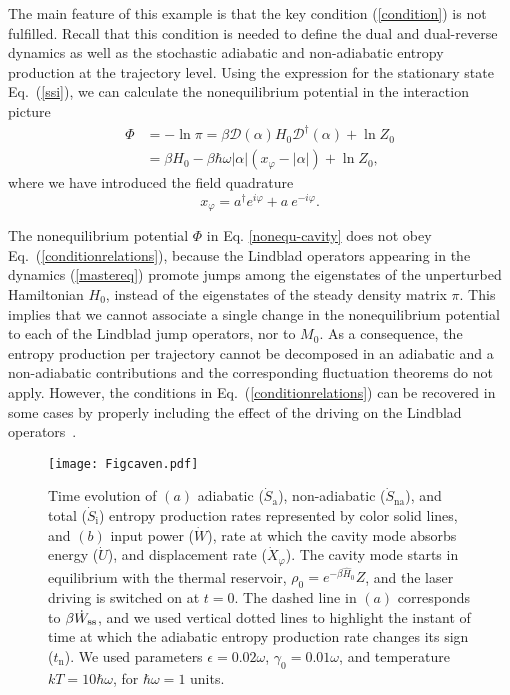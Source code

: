 \documentclass[aps,prx,twocolumn,showpacs,floatfix,superscriptaddress,graphics,longbibliography]{revtex4-1}
\newcommand{\HAT}{}
\begin{document}
The main feature of this example is that the key condition (\ref{condition}) is not fulfilled. Recall that this condition is needed to define the dual and dual-reverse dynamics as well as the stochastic adiabatic and non-adiabatic entropy production at the trajectory level. Using the expression for the stationary state  Eq.~(\ref{ssi}), we can calculate the nonequilibrium potential in the interaction picture
\begin{align} \label{nonequ-cavity}
\HAT{\Phi} &= -\ln\pi= \beta \mathcal{D}(\alpha) H_0 \mathcal{D}^\dagger(\alpha) + \ln Z_0  \nonumber \\ 
&=  \beta H_0 - \beta \hbar \omega |\alpha|( x_{\varphi}-|\alpha|)  + \ln Z_0,
\end{align}
where we have introduced 
the field quadrature 
\begin{equation}
 x_{\varphi}  =  a^\dagger e^{i \varphi} +  a^{~}e^{-i \varphi}.
 \end{equation}


The nonequilibrium potential $\Phi$ in Eq. \eqref{nonequ-cavity} does not obey Eq.~(\ref{conditionrelations}), because the Lindblad operators appearing in the dynamics (\ref{mastereq}) promote jumps among the  eigenstates of the unperturbed Hamiltonian $H_0$, instead of the eigenstates of the steady density matrix $\pi$. This implies that we cannot associate a single change in the nonequilibrium potential to each of the Lindblad jump operators, 
nor to $M_0$. As a consequence, the entropy production per trajectory  cannot be decomposed in an adiabatic and  a non-adiabatic contributions and the corresponding fluctuation theorems do not apply. 
However, the conditions in Eq.~(\ref{conditionrelations}) can be recovered in some cases by properly including the effect of the driving on the Lindblad operators~\cite{JordanPRA}.


\begin{figure*}[t]
\begin{center}
\texttt{[image: Figcaven.pdf]}
\caption{Time evolution of $(a)$ adiabatic ($\dot{S}_{\mathrm a}$), non-adiabatic ($\dot{S}_{\mathrm{na}}$), and total ($\dot{S}_{\mathrm i}$) entropy production rates represented by 
color solid lines, and $(b)$ input power ($\dot{W}$), rate at which the cavity mode absorbs energy ($\dot{U}$), and displacement rate ($\dot{X}_{\varphi}$). The cavity mode starts in 
equilibrium with the thermal reservoir, $\rho_{0}= e^{- \beta \hat{H}_0}{Z}$, and the laser driving is switched on at $t=0$. The dashed line in $(a)$ corresponds to $\beta \dot{W}_{\rm ss}$, and 
we used vertical dotted lines to highlight the instant of time at which the adiabatic entropy production rate changes its sign ($t_\mathrm{n}$). We used parameters 
$\epsilon = 0.02 \omega$, $\gamma_0 = 0.01 \omega$, and temperature $kT = 10  \hbar \omega$, for $\hbar \omega = 1$ units.} 
\label{F-cavityentropy}
\end{center}
\end{figure*}
\end{document}
